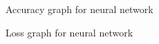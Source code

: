 \documentclass[12pt]{article}
\begin{document}
\begin{figure}[h]
  \centering
  \caption{Accuracy graph for neural network}
\end{figure}

\begin{figure}
  \centering
  \caption{Loss graph for neural network}
\end{figure}
\end{document}
